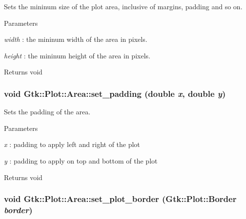 Sets the mininum size of the plot area, inclusive of margins, padding and so on. 
\begin{DoxyParams}{Parameters}
\item[{\em width}]: the mininum width of the area in pixels. \item[{\em height}]: the mininum height of the area in pixels. \end{DoxyParams}
\begin{DoxyReturn}{Returns}
void 
\end{DoxyReturn}
\hypertarget{classGtk_1_1Plot_1_1Area_a44b182e39eab6618344524c0ddc5362c}{
\subsubsection[{set\_\-padding}]{\setlength{\rightskip}{0pt plus 5cm}void Gtk::Plot::Area::set\_\-padding (double {\em x}, \/  double {\em y})}}
\label{classGtk_1_1Plot_1_1Area_a44b182e39eab6618344524c0ddc5362c}


Sets the padding of the area. 
\begin{DoxyParams}{Parameters}
\item[{\em x}]: padding to apply left and right of the plot \item[{\em y}]: padding to apply on top and bottom of the plot \end{DoxyParams}
\begin{DoxyReturn}{Returns}
void 
\end{DoxyReturn}
\hypertarget{classGtk_1_1Plot_1_1Area_a1eac5a10b44cc7cff1c7c238659d6fef}{
\subsubsection[{set\_\-plot\_\-border}]{\setlength{\rightskip}{0pt plus 5cm}void Gtk::Plot::Area::set\_\-plot\_\-border ({\bf Gtk::Plot::Border} {\em border})}}
\label{classGtk_1_1Plot_1_1Area_a1eac5a10b44cc7cff1c7c238659d6fef}


